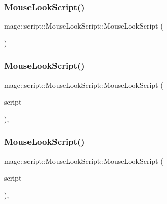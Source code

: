 \subsubsection{\texorpdfstring{Mouse\+Look\+Script()}{MouseLookScript()}\hspace{0.1cm}{\footnotesize\ttfamily [1/3]}}
{\footnotesize\ttfamily mage\+::script\+::\+Mouse\+Look\+Script\+::\+Mouse\+Look\+Script (\begin{DoxyParamCaption}{ }\end{DoxyParamCaption})}

\hypertarget{classmage_1_1script_1_1_mouse_look_script_aa5237c229f27fa29f820bf6517209444}{}\label{classmage_1_1script_1_1_mouse_look_script_aa5237c229f27fa29f820bf6517209444} 
\subsubsection{\texorpdfstring{Mouse\+Look\+Script()}{MouseLookScript()}\hspace{0.1cm}{\footnotesize\ttfamily [2/3]}}
{\footnotesize\ttfamily mage\+::script\+::\+Mouse\+Look\+Script\+::\+Mouse\+Look\+Script (\begin{DoxyParamCaption}\item[{const \hyperlink{classmage_1_1script_1_1_mouse_look_script}{Mouse\+Look\+Script} \&}]{script }\end{DoxyParamCaption})\hspace{0.3cm}{\ttfamily [default]}, {\ttfamily [noexcept]}}

\hypertarget{classmage_1_1script_1_1_mouse_look_script_ac21a383d6718ccc0d6c9faa5c5c1fe50}{}\label{classmage_1_1script_1_1_mouse_look_script_ac21a383d6718ccc0d6c9faa5c5c1fe50} 
\subsubsection{\texorpdfstring{Mouse\+Look\+Script()}{MouseLookScript()}\hspace{0.1cm}{\footnotesize\ttfamily [3/3]}}
{\footnotesize\ttfamily mage\+::script\+::\+Mouse\+Look\+Script\+::\+Mouse\+Look\+Script (\begin{DoxyParamCaption}\item[{\hyperlink{classmage_1_1script_1_1_mouse_look_script}{Mouse\+Look\+Script} \&\&}]{script }\end{DoxyParamCaption})\hspace{0.3cm}{\ttfamily [default]}, {\ttfamily [noexcept]}}

